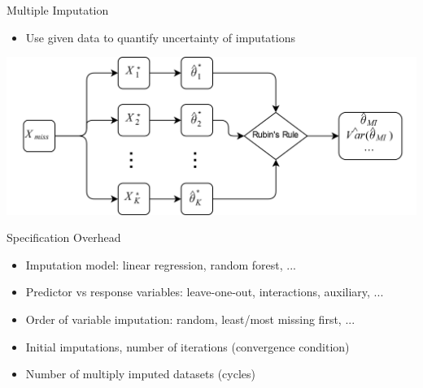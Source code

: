 \documentclass[aspectratio=43]{beamer}
\begin{document}
\begin{frame}{Multiple Imputation}
\begin{itemize}
\item Use given data to quantify uncertainty of imputations
\end{itemize}
\phantom{This text will be invisible} 
\centering
\includegraphics[width=0.9\paperwidth]{MI}
\end{frame}

\begin{frame}{Specification Overhead}
\begin{itemize}
\item Imputation model: linear regression, random forest, ...
\item Predictor vs response variables: leave-one-out, interactions, auxiliary, ...
\item Order of variable imputation: random, least/most missing first, ...
\item Initial imputations, number of iterations (convergence condition)
\item Number of multiply imputed datasets (cycles)
\end{itemize}
\end{frame}
\end{document}
